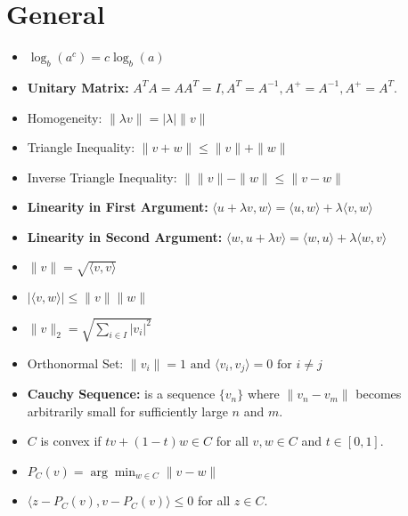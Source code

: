 \documentclass{article}
\begin{document}
\section{General}

\begin{itemize}

\item 

$ \log_b (a^c) = c \log_b (a) $

\item \textbf{Unitary Matrix:} \( A^T A = AA^T = I, A^T = A^{-1}, A^{+} = A^{-1}, A^{+} = A^T \).
\item Homogeneity: $\|\lambda v\| = |\lambda|\|v\|$
\item Triangle Inequality: $\|v + w\| \leq \|v\| + \|w\|$

\item Inverse Triangle Inequality: $\| \|v\| - \|w\| \leq \|v - w\|$

\item \textbf{Linearity in First Argument:} $\langle u + \lambda v, w \rangle = \langle u, w \rangle + \lambda \langle v, w \rangle$
\item \textbf{Linearity in Second Argument:} $\langle w, u + \lambda v \rangle = \langle w, u \rangle + \lambda \langle w, v \rangle$

\item $\|v\| = \sqrt{\langle v, v \rangle}$

\item $|\langle v, w \rangle| \leq \|v\| \|w\|$

 \item 
    $ \|v\|_2 = \sqrt{\sum_{i \in I} |v_i|^2} $

\item Orthonormal Set: $\|v_i\| = 1 \text{ and } \langle v_i, v_j \rangle = 0 \text{ for } i \neq j$

\item \textbf{Cauchy Sequence:} is a sequence $\{v_n\}$ where $\|v_n - v_m\|$ becomes arbitrarily small for sufficiently large $n$ and $m$.

\item $C$ is convex if $tv + (1 - t)w \in C$ for all $v, w \in C$ and $t \in [0, 1]$.

\item $P_C(v) = \arg \min_{w \in C} \|v - w\|$

\item $\langle z - P_C(v), v - P_C(v) \rangle \leq 0$ for all $z \in C$.


\end{itemize}
\end{document}
